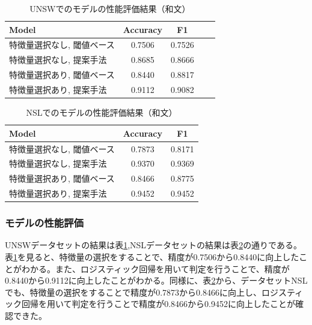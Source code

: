 \documentclass{css}
\begin{document}
\begin{table}[ht]
    \caption{UNSWでのモデルの性能評価結果（和文）}
    \centering
    \footnotesize
    \begin{tabular}{lcccc}
        \hline\hline
        Model & Accuracy & F1 \\
        \hline
        特徴量選択なし, 閾値ベース\cite{AbuAlghanam2023-sx} & 0.7506 & 0.7526 \\
        特徴量選択なし, 提案手法 & 0.8685 & 0.8666 \\
        特徴量選択あり, 閾値ベース\cite{AbuAlghanam2023-sx} & 0.8440 & 0.8817 \\
        特徴量選択あり, 提案手法 & 0.9112 & 0.9082 \\
        \hline
    \end{tabular}
    \label{tab:model_performance_UNSW}
\end{table}

\begin{table}[ht]
    \caption{NSLでのモデルの性能評価結果（和文）}
    \centering
    \footnotesize
    \begin{tabular}{lcc}
        \hline\hline
        Model & Accuracy & F1 \\
        \hline
        特徴量選択なし, 閾値ベース\cite{AbuAlghanam2023-sx} & 0.7873 & 0.8171 \\
        特徴量選択なし, 提案手法 & 0.9370 & 0.9369 \\ 
        特徴量選択あり, 閾値ベース\cite{AbuAlghanam2023-sx} & 0.8466 & 0.8775 \\
        特徴量選択あり, 提案手法 & 0.9452 & 0.9452 \\
        \hline
    \end{tabular}
    \label{tab:model_performance_NSL}
\end{table}

\subsubsection{モデルの性能評価}
UNSWデータセットの結果は表\ref{tab:model_performance_UNSW},NSLデータセットの結果は表\ref{tab:model_performance_NSL}の通りである。表\ref{tab:model_performance_UNSW}を見ると、特徴量の選択をすることで、精度が0.7506から0.8440に向上したことがわかる。また、ロジスティック回帰を用いて判定を行うことで、精度が0.8440から0.9112に向上したことがわかる。同様に、表\ref{tab:model_performance_NSL}から、データセットNSLでも、特徴量の選択をすることで精度が0.7873から0.8466に向上し、ロジスティック回帰を用いて判定を行うことで精度が0.8466から0.9452に向上したことが確認できた。
\end{document}
